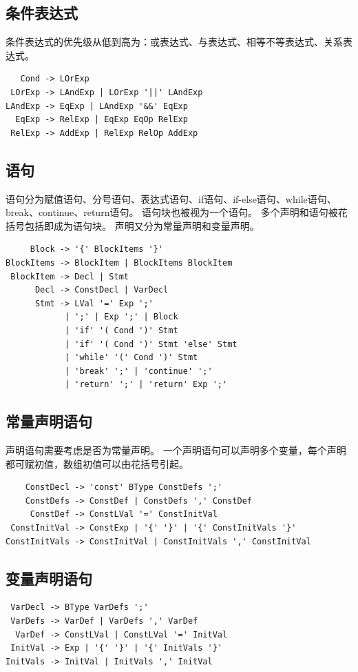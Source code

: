 \documentclass[UTF8,a4paper,10pt]{ctexart}
\begin{document}
    \subsection{条件表达式}
    条件表达式的优先级从低到高为：或表达式、与表达式、相等不等表达式、关系表达式。
    \begin{lstlisting}
   Cond -> LOrExp
 LOrExp -> LAndExp | LOrExp '||' LAndExp
LAndExp -> EqExp | LAndExp '&&' EqExp
  EqExp -> RelExp | EqExp EqOp RelExp
 RelExp -> AddExp | RelExp RelOp AddExp
    \end{lstlisting}

    \subsection{语句}
    语句分为赋值语句、分号语句、表达式语句、if语句、if-else语句、while语句、break、continue、return语句。
    语句块也被视为一个语句。
    多个声明和语句被花括号包括即成为语句块。
    声明又分为常量声明和变量声明。
    \begin{lstlisting}
     Block -> '{' BlockItems '}'
BlockItems -> BlockItem | BlockItems BlockItem
 BlockItem -> Decl | Stmt
      Decl -> ConstDecl | VarDecl
      Stmt -> LVal '=' Exp ';'
            | ';' | Exp ';' | Block
            | 'if' '( Cond ')' Stmt
            | 'if' '( Cond ')' Stmt 'else' Stmt
            | 'while' '(' Cond ')' Stmt
            | 'break' ';' | 'continue' ';'
            | 'return' ';' | 'return' Exp ';'
    \end{lstlisting}

    \subsection{常量声明语句}
    声明语句需要考虑是否为常量声明。
    一个声明语句可以声明多个变量，每个声明都可赋初值，数组初值可以由花括号引起。
    \begin{lstlisting}
    ConstDecl -> 'const' BType ConstDefs ';'
    ConstDefs -> ConstDef | ConstDefs ',' ConstDef
     ConstDef -> ConstLVal '=' ConstInitVal
 ConstInitVal -> ConstExp | '{' '}' | '{' ConstInitVals '}'
ConstInitVals -> ConstInitVal | ConstInitVals ',' ConstInitVal
    \end{lstlisting}

    \subsection{变量声明语句}
    \begin{lstlisting}
 VarDecl -> BType VarDefs ';'
 VarDefs -> VarDef | VarDefs ',' VarDef
  VarDef -> ConstLVal | ConstLVal '=' InitVal
 InitVal -> Exp | '{' '}' | '{' InitVals '}'
InitVals -> InitVal | InitVals ',' InitVal
    \end{lstlisting}
\end{document}
